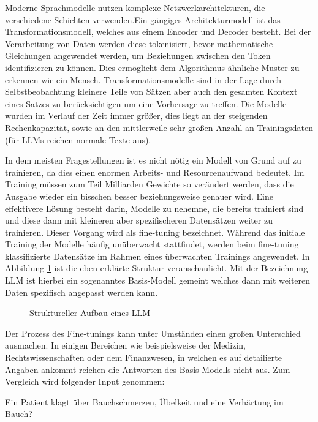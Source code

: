 \documentclass[11pt,a4paper]{report}
\begin{document}
\noindent
Moderne Sprachmodelle nutzen komplexe Netzwerkarchitekturen, die verschiedene Schichten verwenden.Ein gängiges Architekturmodell ist das Transformationsmodell, welches aus einem Encoder und Decoder besteht. Bei der Verarbeitung von Daten werden diese tokenisiert, bevor mathematische Gleichungen angewendet werden, um Beziehungen zwischen den Token identifizieren zu können. Dies ermöglicht dem Algorithmus ähnliche Muster zu erkennen wie ein Mensch. Transformationsmodelle sind in der Lage durch Selbstbeobachtung kleinere Teile von Sätzen aber auch den gesamten Kontext eines Satzes zu berücksichtigen um eine Vorhersage zu treffen. Die Modelle wurden im Verlauf der Zeit immer größer, dies liegt an der steigenden Rechenkapazität, sowie an den mittlerweile sehr großen Anzahl an Trainingsdaten (für LLMs reichen normale Texte aus).

\noindent
In dem meisten Fragestellungen ist es nicht nötig ein Modell von Grund auf zu trainieren, da dies einen enormen Arbeits- und Resourcenaufwand bedeutet. Im Training müssen zum Teil Milliarden Gewichte so verändert werden, dass die Ausgabe wieder ein bisschen besser beziehungsweise genauer wird. Eine effektivere Lösung besteht darin, Modelle zu nehemne, die bereits trainiert sind und diese dann mit kleineren aber spezifischeren Datensätzen weiter zu trainieren. Dieser Vorgang wird als \glqq fine-tuning\grqq{} bezeichnet. Während das initiale Training der Modelle häufig unüberwacht stattfindet, werden beim \glqq fine-tuning \grqq{} klassifizierte Datensätze im Rahmen eines überwachten Trainings angewendet.
In Abbildung \ref{fig:LLM_Struktur} ist die eben erklärte Struktur veranschaulicht. Mit der Bezeichnung \glqq LLM \grqq{} ist hierbei ein sogenanntes Basis-Modell gemeint welches dann mit weiteren Daten spezifisch angepasst werden kann.

\begin{figure}[H]
    \centerline{}
    \caption{Struktureller Aufbau eines LLM}
    \label{fig:LLM_Struktur}
\end{figure}

\noindent
Der Prozess des Fine-tunings kann unter Umständen einen großen Unterschied ausmachen. In einigen Bereichen wie beispielsweise der Medizin, Rechtswissenschaften oder dem Finanzwesen, in welchen es auf detailierte Angaben ankommt reichen die Antworten des Basis-Modells nicht aus. Zum Vergleich wird folgender Input genommen:


\glqq Ein Patient klagt über Bauchschmerzen, Übelkeit und eine Verhärtung im Bauch? \grqq{}
\end{document}
